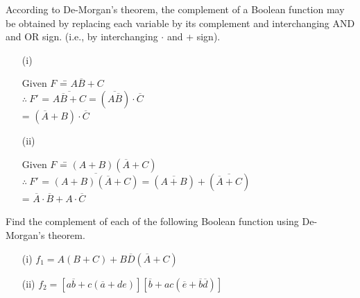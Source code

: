 \begin{solution}
According to De-Morgan's theorem, the complement of a Boolean function may be obtained by replacing each variable by its complement and interchanging AND and OR sign. (i.e., by interchanging $\cdot$ and + sign).
\begin{itemize}
\item[(i)]
\begin{tabbing}
Given $F$ \== $A\overline{B}+C$\\[3pt]
\phantom{AI} $\therefore~ F'$ \>= $\overline{A\overline{B}+C}=(\overline{A\overline{B}})\cdot \overline{C}$\\[3pt]
\>= $(\overline{A}+B)\cdot \overline{C}$
\end{tabbing}

\item[(ii)] 
\begin{tabbing}
Given $F$ \== $(A+B)(\overline{A}+C)$\\[3pt]
\phantom{AI} $\therefore~ F'$ \>= $\overline{(A+B)(\overline{A}+C)}=(\overline{A+B})+(\overline{\overline{A}+C})$\\[3pt]
\>= $\overline{A}\cdot \overline{B}+A\cdot \overline{C}$
\end{tabbing}
\end{itemize}
\end{solution}

\begin{problem}\label{prob5.64}
Find the complement of each of the following Boolean function using De-Morgan's theorem.
\begin{itemize}
\item[(i)] $f_{1}=A(B+C)+B\overline{D}(\overline{A}+C)$

\item[(ii)] $f_{2}=[a\overline{b}+c(\overline{a}+de)][\overline{b}+ac(\overline{e}+\overline{b}\overline{d})]$
\end{itemize}
\end{problem}

